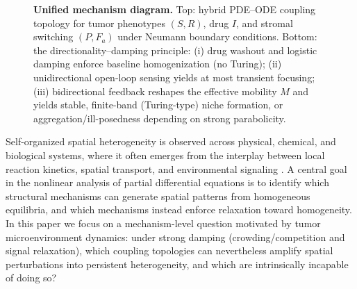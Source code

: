 \documentclass[pdflatex,sn-mathphys-ay]{sn-jnl}
\theoremstyle{thmstyleone}
\theoremstyle{definition}
\theoremstyle{remark}
\begin{document}
\begin{figure}[t]
{
}
\caption{\textbf{Unified mechanism diagram.} Top: hybrid PDE--ODE coupling topology for tumor phenotypes $(S,R)$, drug $I$, and stromal switching $(P,F_a)$ under Neumann boundary conditions. Bottom: the directionality--damping principle: (i) drug washout and logistic damping enforce baseline homogenization (no Turing); (ii) unidirectional open-loop sensing yields at most transient focusing; (iii) bidirectional feedback reshapes the effective mobility $M$ and yields stable, finite-band (Turing-type) niche formation, or aggregation/ill-posedness depending on strong parabolicity.}
\label{fig:unified_mechanism}
\end{figure}

Self-organized spatial heterogeneity is observed across physical, chemical, and biological systems, where it often emerges from the interplay between local reaction kinetics, spatial transport, and environmental signaling \citep{cross1993pattern,dolnik2001resonant,murray2003mathematical,wang2026damage,colizza2007reaction,belik2011natural}. 
A central goal in the nonlinear analysis of partial differential equations is to identify which structural mechanisms can generate spatial patterns from homogeneous equilibria, and which mechanisms instead enforce relaxation toward homogeneity. 
In this paper we focus on a mechanism-level question motivated by tumor microenvironment dynamics: under strong damping (crowding/competition and signal relaxation), which coupling topologies can nevertheless amplify spatial perturbations into persistent heterogeneity, and which are intrinsically incapable of doing so?
\end{document}
